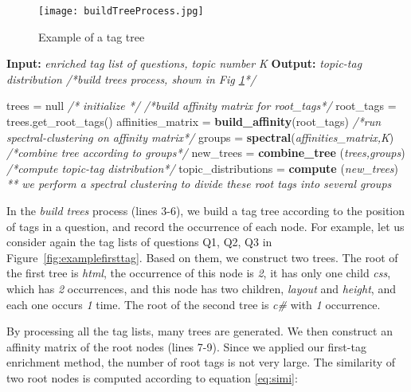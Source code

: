\begin{figure}[htp]
\centering
\texttt{[image: buildTreeProcess.jpg]}  
\caption{Example of a tag tree}
\label{fig:tagtree} 
\end{figure}



\begin{algorithm}%
\label{algo:algotopic}
\begin{algorithmic}[1]
\State \textbf{Input:} \textit{ enriched tag list of questions, topic number K}
\State \textbf{Output:} \textit{topic-tag distribution}
\State \textit{/*build trees process, shown in Fig \ref{fig:tagtree}*/}

\State trees = null \textit{/* initialize */}
\EndFor
\State \textit{/*build affinity matrix for root\_tags*/}
\State root\_tags = trees.get\_root\_tags() 
\State   affinities\_matrix = \textbf{build\_affinity}(root\_tags) 
\State  \textit{/*run spectral-clustering on affinity matrix*/}
\State  groups = \textbf{spectral}(\textit{affinities\_matrix,K})
\State  \textit{/*combine tree according to groups*/}
\State  new\_trees = \textbf{combine\_tree} (\textit{trees,groups})   
\State  \textit{/*compute topic-tag distribution*/}
\State  topic\_distributions = \textbf{compute} (\textit{new\_trees})
\State \textit{** we perform a spectral clustering to divide these root tags into several groups}
\end{algorithmic}
\end{algorithm}

In the \textit{build trees} process (lines 3-6), we build a tag tree according to the position of tags in a question, and record the occurrence of each node. For example, let us consider again the tag lists of questions Q1, Q2, Q3 in Figure~\ref{fig:examplefirsttag}. Based on them, we construct two trees. The root of the first tree is \textit{html}, the occurrence of this node is \textit{2}, it has only one child \textit{css}, which has \textit{2} occurrences, and this node has two children, \textit{layout} and \textit{height}, and each one occurs \textit{1} time. The root of the second tree is \textit{c\#} with \textit{1} occurrence.

By processing all the tag lists, many trees are generated. We then construct an affinity matrix of the root nodes (lines 7-9). Since we applied our first-tag enrichment method, the number of root tags is not very large. The similarity of two root nodes is computed according to equation \ref{eq:simi}:


